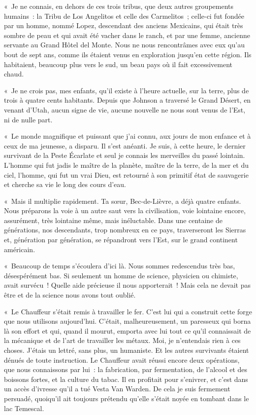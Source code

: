 \documentclass[french,twoside]{book} %
\begin{document}
« Je ne connais, en dehors de ces trois tribus, que deux autres groupements humains : la Tribu de Los Angelitos et celle des Carmelitos ; celle-ci fut fondée par un homme, nommé Lopez, descendant des anciens Mexicains, qui était très sombre de peau et qui avait été vacher dans le ranch, et par une femme, ancienne servante au Grand Hôtel del Monte. Nous ne nous rencontrâmes avec eux qu’au bout de sept ans, comme ils étaient venus en exploration jusqu’en cette région. Ils habitaient, beaucoup plus vers le sud, un beau pays où il fait excessivement chaud.\par
« Je ne crois pas, mes enfants, qu’il existe à l’heure actuelle, sur la terre, plus de trois à quatre cents habitants. Depuis que Johnson a traversé le Grand Désert, en venant d’Utah, aucun signe de vie, aucune nouvelle ne nous sont venus de l’Est, ni de nulle part.\par
« Le monde magnifique et puissant que j’ai connu, aux jours de mon enfance et à ceux de ma jeunesse, a disparu. Il s’est anéanti. Je suis, à cette heure, le dernier survivant de la Peste Écarlate et seul je connais les merveilles du passé lointain. L’homme qui fut jadis le maître de la planète, maître de la terre, de la mer et du ciel, l’homme, qui fut un vrai Dieu, est retourné à son primitif état de sauvagerie et cherche sa vie le long des cours d’eau.\par
« Mais il multiplie rapidement. Ta sœur, Bec-de-Lièvre, a déjà quatre enfants. Nous préparons la voie à un autre saut vers la civilisation, voie lointaine encore, assurément, très lointaine même, mais inéluctable. Dans une centaine de générations, nos descendants, trop nombreux en ce pays, traverseront les Sierras et, génération par génération, se répandront vers l’Est, sur le grand continent américain.\par
« Beaucoup de temps s’écoulera d’ici là. Nous sommes redescendus très bas, désespérément bas. Si seulement un homme de science, physicien ou chimiste, avait survécu ! Quelle aide précieuse il nous apporterait ! Mais cela ne devait pas être et de la science nous avons tout oublié.\par
« Le Chauffeur s’était remis à travailler le fer. C’est lui qui a construit cette forge que nous utilisons aujourd’hui. C’était, malheureusement, un paresseux qui borna là son effort et qui, quand il mourut, emporta avec lui tout ce qu’il connaissait de la mécanique et de l’art de travailler les métaux. Moi, je n’entendais rien à ces choses. J’étais un lettré, sans plus, un humaniste. Et les autres survivants étaient dénués de toute instruction. Le Chauffeur avait réussi encore deux opérations, que nous connaissons par lui : la fabrication, par fermentation, de l’alcool et des boissons fortes, et la culture du tabac. Il en profitait pour s’enivrer, et c’est dans un accès d’ivresse qu’il a tué Vesta Van Warden. De cela je suis fermement persuadé, quoiqu’il ait toujours prétendu qu’elle s’était noyée en tombant dans le lac Temescal.\par
\end{document}
